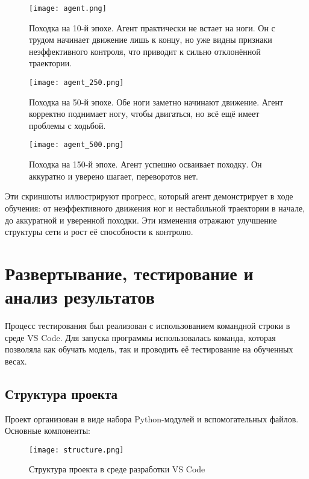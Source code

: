 \documentclass[a4paper,12pt]{article}
\begin{document}
\begin{figure}[H]
	\centering
	\texttt{[image: agent.png]}
	\caption{Походка на 10-й эпохе. Агент практически не встает на ноги. Он с трудом начинает движение лишь к концу, но уже видны признаки неэффективного контроля, что приводит к сильно отклонённой траектории.}
	\label{fig:landing_epoch50}
\end{figure}

\begin{figure}[H]
	\centering
	\texttt{[image: agent\_250.png]}
	\caption{Походка на 50-й эпохе. Обе ноги заметно начинают движение. Агент корректно поднимает ногу, чтобы двигаться, но всё ещё имеет проблемы с ходьбой.}
	\label{fig:landing_epoch250}
\end{figure}

\begin{figure}[H]
	\centering
	\texttt{[image: agent\_500.png]}
	\caption{Походка на 150-й эпохе. Агент успешно осваивает походку. Он аккуратно и уверено шагает, переворотов нет.}
	\label{fig:landing_epoch500}
\end{figure}

Эти скриншоты иллюстрируют прогресс, который агент демонстрирует в ходе обучения: от неэффективного движения ног и нестабильной траектории в начале, до аккуратной и уверенной походки. Эти изменения отражают улучшение структуры сети и рост её способности к контролю.
\newpage
\section{Развертывание, тестирование и анализ результатов}

Процесс тестирования был реализован с использованием командной строки в среде VS Code. Для запуска программы использовалась команда, которая позволяла как обучать модель, так и проводить её тестирование на обученных весах.

\subsection{Структура проекта}

Проект организован в виде набора Python-модулей и вспомогательных файлов. Основные компоненты:

\begin{figure}[H]
	\centering
	\texttt{[image: structure.png]}
	\caption{Структура проекта в среде разработки VS Code}
	\label{fig:struct_screenshot}
\end{figure}
\end{document}
